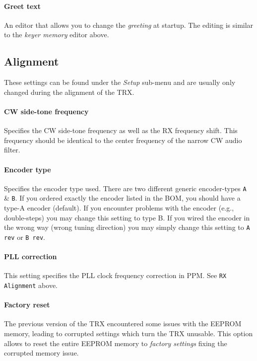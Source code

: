 \documentclass[10pt, a4paper,twoside]{scrartcl}
\begin{document}
\paragraph{Greet text}
An editor that allows you to change the \emph{greeting} at startup. The editing is similar to the \emph{keyer memory} editor above.


\subsection{Alignment}
These settings can be found under the \emph{Setup} sub-menu and are usually only changed during the alignment of the TRX. 

\paragraph{CW side-tone frequency}
Specifies the CW side-tone frequency as well as the RX frequency shift. This frequency should be identical to the center frequency of the narrow CW audio filter.

\paragraph{Encoder type}
Specifies the encoder type used. There are two different generic encoder-types \texttt{A} \& \texttt{B}. If you ordered exactly the encoder listed in the BOM, you should have a type-A encoder (default). If you encounter problems with the encoder (e.g., double-steps) you may change this setting to type B. If you wired the encoder in the wrong way (wrong tuning direction) you may simply change this setting to \texttt{A rev} or \texttt{B rev}. 

\paragraph{PLL correction}
This setting specifies the PLL clock frequency correction in PPM. See \texttt{RX Alignment} above.

\paragraph{Factory reset}
The previous version of the TRX encountered some issues with the EEPROM memory, leading to corrupted settings which turn the TRX unusable. This option allows to reset the entire EEPROM memory to \emph{factory settings} fixing the corrupted memory issue.
\end{document}
